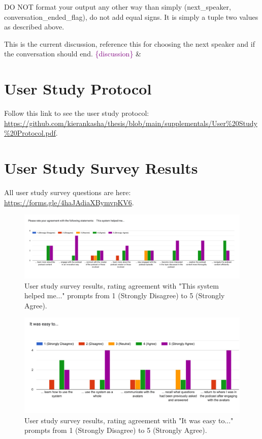 \documentclass[12pt]{report}
\begin{document}
\begin{myfont}
\begin{longtable}[h]
            DO NOT format your output any other way than simply (next\_speaker, conversation\_ended\_flag), do not add equal signs. It is simply a tuple two values as described above.
            
            This is the current discussion, reference this for choosing the next speaker and if the conversation should end.
            \textcolor{Purple}{\{discussion\}} &\\
            \bottomrule
        \end{longtable}
        
        \chapter{User Study Protocol}
        \label{app:I}
        Follow this link to see the user study protocol: \url{https://github.com/kierankasha/thesis/blob/main/supplementals/User%20Study%20Protocol.pdf}.
        
        \chapter{User Study Survey Results}
        \label{app:J}
        All user study survey questions are here: \url{https://forms.gle/4haJAdiaXBymvpKV6}.

        \begin{figure}[H]
        \centering
          \includegraphics[width=1\textwidth]{figures/user1.png}
          \caption{User study survey results, rating agreement with "This system helped me..." prompts from 1 (Strongly Disagree) to 5 (Strongly Agree).}
        \end{figure}

        \begin{figure}[H]
        \centering
          \includegraphics[width=1\textwidth]{figures/user2.png}
          \caption{User study survey results, rating agreement with "It was easy to..." prompts from 1 (Strongly Disagree) to 5 (Strongly Agree).}
        \end{figure}


\end{myfont}
\end{document}
